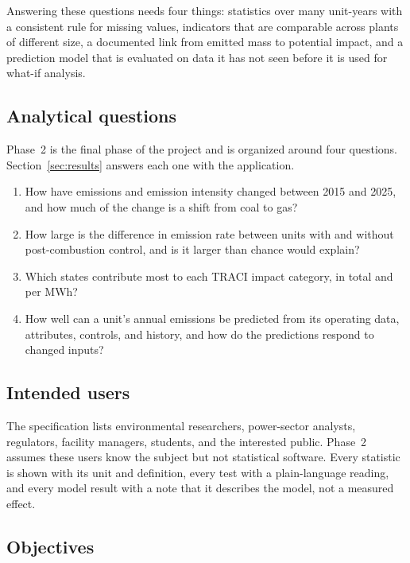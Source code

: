 \documentclass[11pt,a4paper]{article}
\begin{document}
Answering these questions needs four things: statistics over many unit-years with a consistent
rule for missing values, indicators that are comparable across plants of different size, a
documented link from emitted mass to potential impact, and a prediction model that is evaluated
on data it has not seen before it is used for what-if analysis.

\subsection{Analytical questions}

Phase~2 is the final phase of the project and is organized around four questions. Section~\ref{sec:results} answers each one with the
application.
\begin{enumerate}[label=Q\arabic*.]
  \item How have emissions and emission intensity changed between 2015 and 2025, and how much of
        the change is a shift from coal to gas?
  \item How large is the difference in \NOx{} emission rate between units with and without
        post-combustion \NOx{} control, and is it larger than chance would explain?
  \item Which states contribute most to each TRACI impact category, in total and per MWh?
  \item How well can a unit's annual \NOx{} emissions be predicted from its operating data,
        attributes, controls, and history, and how do the predictions respond to changed inputs?
\end{enumerate}

\subsection{Intended users}

The specification lists environmental researchers, power-sector analysts, regulators, facility
managers, students, and the interested public. Phase~2 assumes these users know the subject but
not statistical software. Every statistic is shown with its unit and definition, every test
with a plain-language reading, and every model result with a note that it describes the model,
not a measured effect.

\subsection{Objectives}
\end{document}
